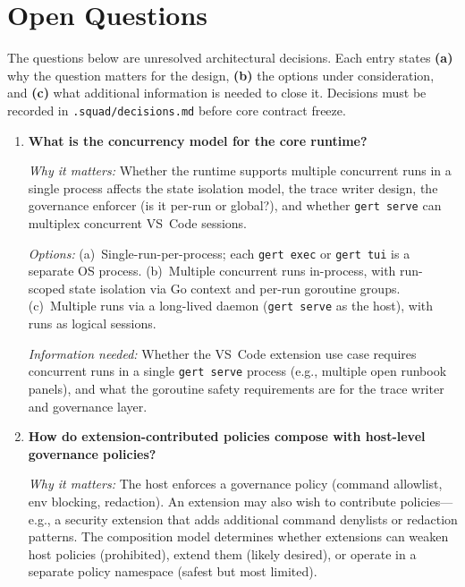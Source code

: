 \chapter{Open Questions}
\label{ch:questions}

The questions below are unresolved architectural decisions. Each entry states \textbf{(a)} why the
question matters for the design, \textbf{(b)} the options under consideration, and \textbf{(c)} what
additional information is needed to close it. Decisions must be recorded in \texttt{.squad/decisions.md}
before core contract freeze.

\begin{enumerate}[label=\textbf{Q\arabic*.}]

  \item \textbf{What is the concurrency model for the core runtime?}

    \textit{Why it matters:} Whether the runtime supports multiple
    concurrent runs in a single process affects the state isolation model, the trace writer design,
    the governance enforcer (is it per-run or global?), and whether \texttt{gert serve} can multiplex
    concurrent VS~Code sessions.

    \textit{Options:} (a)~Single-run-per-process; each \texttt{gert exec} or
    \texttt{gert tui} is a separate OS process. (b)~Multiple concurrent runs in-process, with
    run-scoped state isolation via Go context and per-run goroutine groups. (c)~Multiple runs via a
    long-lived daemon (\texttt{gert serve} as the host), with runs as logical sessions.

    \textit{Information needed:} Whether the VS~Code extension use case requires concurrent runs in a
    single \texttt{gert serve} process (e.g., multiple open runbook panels), and what the goroutine
    safety requirements are for the trace writer and governance layer.

  \item \textbf{How do extension-contributed policies compose with host-level governance policies?}

    \textit{Why it matters:} The host enforces a governance policy (command allowlist, env blocking,
    redaction). An extension may also wish to contribute policies---e.g., a security extension that
    adds additional command denylists or redaction patterns. The composition model determines whether
    extensions can weaken host policies (prohibited), extend them (likely desired), or operate in a
    separate policy namespace (safest but most limited).


\end{enumerate}
